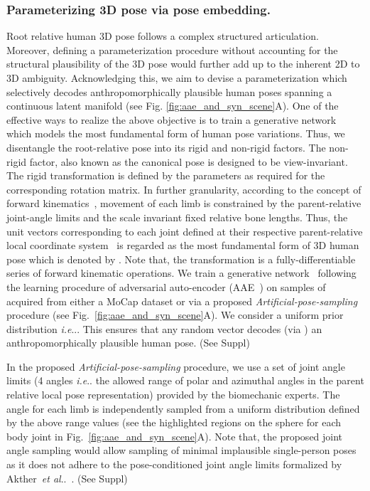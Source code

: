 \documentclass[runningheads]{llncs}
\makeatletter
\DeclareRobustCommand\onedot{\futurelet\@let@token\@onedot}
\def\@onedot{\ifx\@let@token.\else.\null\fi\xspace}
\def\ie{\emph{i.e}\onedot} \def\Ie{\emph{I.e}\onedot}
\def\etal{\emph{et al}\onedot}
\makeatother
\begin{document}
\subsubsection{Parameterizing 3D pose via pose embedding.}
\label{sec:aae}
Root relative human 3D pose follows a complex structured articulation. Moreover, defining a parameterization procedure without accounting for the structural plausibility of the 3D pose would further add up to the inherent 2D to 3D ambiguity. Acknowledging this, we aim to devise a parameterization which selectively decodes anthropomorphically plausible human poses spanning a continuous latent manifold (see Fig. \ref{fig:aae_and_syn_scene}{\color{red}A}). One of the effective ways to realize the above objective is to train a generative network~\cite{kundu2019gan} which models the most fundamental form of human pose variations. Thus, we disentangle the root-relative pose  into its rigid and non-rigid factors. The non-rigid factor, also known as the canonical pose  is designed to be view-invariant. The rigid transformation is defined by the parameters  as required for the corresponding rotation matrix. In further granularity, according to the concept of forward kinematics~\cite{zhou2016deep}, movement of each limb is constrained by the parent-relative joint-angle limits and the scale invariant fixed relative bone lengths. Thus, the unit vectors corresponding to each joint defined at their respective parent-relative local coordinate system~\cite{akhter2015pose} is regarded as the most fundamental form of 3D human pose which is denoted by . Note that, the transformation  is a fully-differentiable series of forward kinematic operations. We train a generative network~\cite{kundu2019bihmp,kundu2019unsupervised} following the learning procedure of adversarial auto-encoder  (AAE~\cite{makhzani2015adversarial})  on samples of  acquired from either a MoCap \cite{cmumocap} dataset or via a proposed \textit{Artificial-pose-sampling} procedure (see Fig.~\ref{fig:aae_and_syn_scene}{\color{red}A}). We consider a uniform prior distribution \ie . This ensures that any random vector  decodes (via ) an anthropomorphically plausible human pose. (See Suppl)

In the proposed \textit{Artificial-pose-sampling} procedure, we use a set of joint angle limits (4 angles \ie the allowed range of polar and azimuthal angles in the parent relative local pose representation) provided by the biomechanic experts. The angle for each limb is independently sampled from a uniform distribution defined by the above range values (see the highlighted regions on the sphere for each body joint in Fig.~\ref{fig:aae_and_syn_scene}{\color{red}A}). Note that, the proposed joint angle sampling would allow sampling of minimal implausible single-person poses as it does not adhere to the pose-conditioned joint angle limits formalized by Akther~\etal~\cite{akhter2015pose}. (See Suppl)
\end{document}
